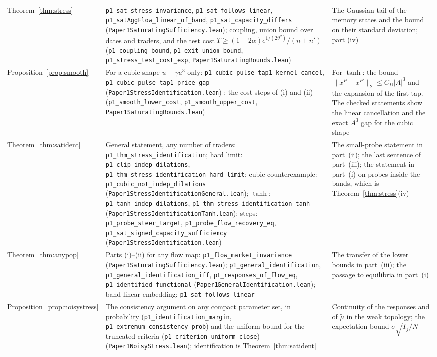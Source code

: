 \documentclass[12pt]{article}
\theoremstyle{definition}
\theoremstyle{remark}
\begin{document}
\begin{longtable}{>{\raggedright\arraybackslash}p{}>{\raggedright\arraybackslash}p{}>{\raggedright\arraybackslash}p{}}
Theorem~\ref{thm:stress} & \texttt{p1\_sat\_stress\_invariance}, \texttt{p1\_sat\_follows\_linear}, \texttt{p1\_satAggFlow\_linear\_of\_band}, \texttt{p1\_sat\_capacity\_differs} (\nolinkurl{Paper1SaturatingSufficiency.lean}); coupling, union bound over dates and traders, and the test cost $T\ge(1-2\alpha)e^{1/(2\vartheta^2)}/(n+n')$ (\texttt{p1\_coupling\_bound}, \texttt{p1\_exit\_union\_bound}, \texttt{p1\_stress\_test\_cost\_exp}, \nolinkurl{Paper1SaturatingBounds.lean}) & The Gaussian tail of the memory states and the bound on their standard deviation; part (iv)\\
Proposition~\ref{prop:smooth} & For a cubic shape $u-\gamma u^3$ only: \texttt{p1\_cubic\_pulse\_tap1\_kernel\_cancel}, \texttt{p1\_cubic\_pulse\_tap1\_price\_gap} (\nolinkurl{Paper1StressIdentification.lean}) ; the cost steps of (i) and (ii) (\texttt{p1\_smooth\_lower\_cost}, \texttt{p1\_smooth\_upper\_cost}, \nolinkurl{Paper1SaturatingBounds.lean}) & For $\tanh$: the bound $\|x^P-x^{P'}\|_2\le C_D|A|^3$ and the expansion of the first tap. The checked statements show the linear cancellation and the exact $A^3$ gap for the cubic shape\\
Theorem~\ref{thm:satident} & General statement, any number of traders: \texttt{p1\_thm\_stress\_identification}; hard limit: \texttt{p1\_clip\_indep\_dilations}, \nolinkurl{p1_thm_stress_identification_hard_limit}; cubic counterexample: \texttt{p1\_cubic\_not\_indep\_dilations} (\nolinkurl{Paper1StressIdentificationGeneral.lean}); $\tanh$: \texttt{p1\_tanh\_indep\_dilations}, \nolinkurl{p1_thm_stress_identification_tanh} (\nolinkurl{Paper1StressIdentificationTanh.lean}); steps: \texttt{p1\_probe\_steer\_target}, \texttt{p1\_probe\_flow\_recovery\_eq}, \texttt{p1\_sat\_signed\_capacity\_sufficiency} (\nolinkurl{Paper1StressIdentification.lean}) & The small-probe statement in part~(ii); the last sentence of part~(iii); the statement in part~(i) on probes inside the bands, which is Theorem~\ref{thm:stress}(iv)\\
Theorem~\ref{thm:anypop} & Parts (i)--(ii) for any flow map: \texttt{p1\_flow\_market\_invariance} (\nolinkurl{Paper1SaturatingSufficiency.lean}); \texttt{p1\_general\_identification}, \texttt{p1\_general\_identification\_iff}, \texttt{p1\_responses\_of\_flow\_eq}, \texttt{p1\_identified\_functional} (\nolinkurl{Paper1GeneralIdentification.lean}); band-linear embedding: \texttt{p1\_sat\_follows\_linear} & The transfer of the lower bounds in part~(iii); the passage to equilibria in part~(i)\\
Proposition~\ref{prop:noisystress} & The consistency argument on any compact parameter set, in probability (\texttt{p1\_identification\_margin}, \texttt{p1\_extremum\_consistency\_prob}) and the uniform bound for the truncated criteria (\texttt{p1\_criterion\_uniform\_close}) (\nolinkurl{Paper1NoisyStress.lean}); identification is Theorem~\ref{thm:satident} & Continuity of the responses and of $\tilde\mu$ in the weak topology; the expectation bound $\sigma\sqrt{T_j/N}$\\

\end{longtable}
\end{document}
